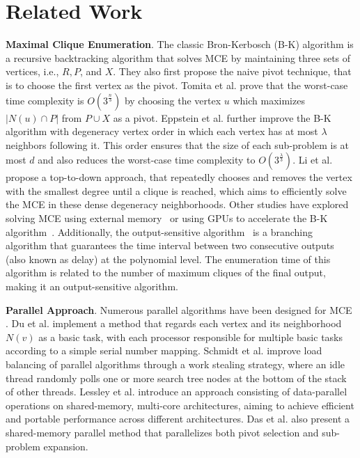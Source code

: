 \documentclass[sigconf, nonacm]{acmart}
\begin{document}
\section{Related Work} \label{sec8}

\noindent\textbf{Maximal Clique Enumeration}. The classic Bron-Kerbosch (B-K) algorithm\cite{bk1973} is a recursive backtracking algorithm that solves MCE by maintaining three sets of vertices, i.e., $R,P$, and $X$. %
They also first propose the naive pivot technique, that is to choose the first vertex as the pivot. Tomita et al. \cite{tomita2006worst} prove that the worst-case time complexity is $O(3^{\frac{n}{3}})$ by choosing the vertex $u$ which maximizes $\lvert N(u) \cap P \rvert$ from $P \cup X$ as a pivot. Eppstein et al. \cite{eppstein2010listing} further improve the B-K algorithm with degeneracy vertex order in which each vertex has at most $\lambda$ neighbors following it. This order ensures that the size of each sub-problem is at most $d$ and also reduces the worst-case time complexity to $O(3^{\frac{\lambda}{3}})$. Li et al.~\cite{li2019fast} propose a top-to-down approach, that repeatedly chooses and removes the vertex with the smallest degree until a clique is reached, which aims to efficiently solve the MCE in these dense degeneracy neighborhoods. Other studies have explored solving MCE using external memory~\cite{cheng2011finding} or using GPUs to accelerate the B-K algorithm~\cite{wei2021accelerating}. Additionally, the output-sensitive algorithm~\cite{tsukiyama1977new,makino2004new,chang2013fast,conte2016sublinear} is a branching algorithm that guarantees the time interval between two consecutive outputs (also known as delay) at the polynomial level. The enumeration time of this algorithm is related to the number of maximum cliques of the final output, making it an output-sensitive algorithm.



\noindent\textbf{Parallel Approach}. Numerous parallel algorithms have been designed for MCE \cite{du2006parallel,schmidt2009scalable,lessley2017maximal,san2018efficiently, das2018shared}. Du et al. \cite{du2006parallel} implement a method that regards each vertex and its neighborhood $N(v)$ as a basic task, with each processor responsible for multiple basic tasks according to a simple serial number mapping. Schmidt et al. \cite{schmidt2009scalable} improve load balancing of parallel algorithms through a work stealing strategy, where an idle thread randomly polls one or more search tree nodes at the bottom of the stack of other threads. Lessley et al. \cite{lessley2017maximal} introduce an approach consisting of data-parallel operations on shared-memory, multi-core architectures, aiming to achieve efficient and portable performance across different architectures. Das et al. \cite{das2018shared} also present a shared-memory parallel method that parallelizes both pivot selection and sub-problem expansion.
\end{document}
